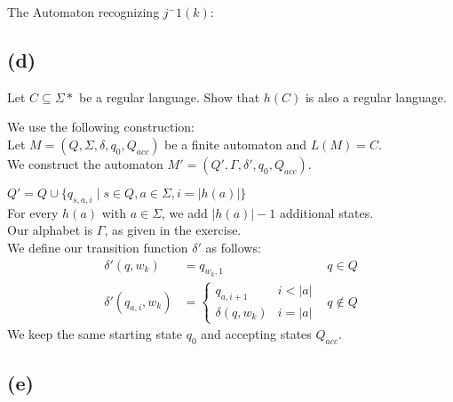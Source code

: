 The Automaton recognizing $j^-1(k)$: \\


\subsection{(d)}

Let $C \subseteq \Sigma *$ be a regular language. Show that $h(C)$ is also a regular language.

We use the following construction:\\
Let $M=(Q,\Sigma,\delta,q_{0},Q_{acc})$ be a finite automaton and $L(M)=C$.\\
We construct the automaton $M'=(Q',\Gamma,\delta', q_{0}, Q_{acc})$.

$Q'=Q\cup \{ q_{s,a,i}\mid s\in Q, a \in \Sigma, i = \lvert h(a) \rvert \} $\\
For every $h(a)$ with $a \in \Sigma$, we add $\lvert h(a)\rvert -1$ additional states.\\
Our alphabet is $\Gamma$, as given in the exercise.\\
We define our transition function $\delta'$ as follows:\\
\begin{align*}
\delta' (q, w_{k}) &= q_{w_{k},1} &q\in Q\\
\delta' (q_{a,i}, w_{k}) &= 
\begin{cases}
    q_{a,i+1} &i < \lvert a \rvert\\
    \delta(q, w_{k})&i=\lvert a \rvert
\end{cases}
&q\notin Q
\end{align*}
We keep the same starting state $q_{0}$ and accepting states $Q_{acc}$.\\



\subsection{(e)}

